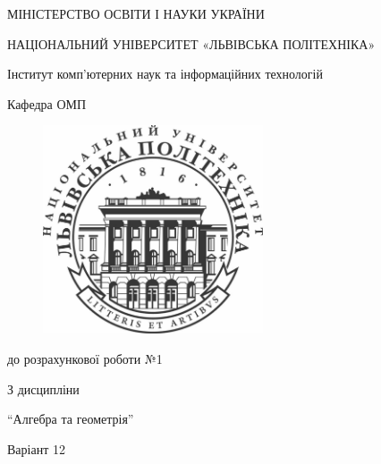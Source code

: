 \documentclass{article}
\begin{document}
\pagestyle{empty}
\begin{center}

	{\fontsize{14}{24}\selectfont МІНІСТЕРСТВО ОСВІТИ І НАУКИ УКРАЇНИ

	НАЦІОНАЛЬНИЙ УНІВЕРСИТЕТ «ЛЬВІВСЬКА ПОЛІТЕХНІКА»

	Інститут комп'ютерних наук та інформаційних технологій

	Кафедра ОМП

	}

	\vspace{90.4pt} %
	\begin{figure}[h]
		\centering
		\includegraphics[width=6.5cm,keepaspectratio]{../../lpnu.png}
	\end{figure}

	{\fontsize{18}{29}\selectfont{Звіт}

	{до розрахункової роботи №1}

	{З дисципліни}

	{``Алгебра та геометрія''}

	{Варіант 12}

	}
\end{center}
\end{document}
